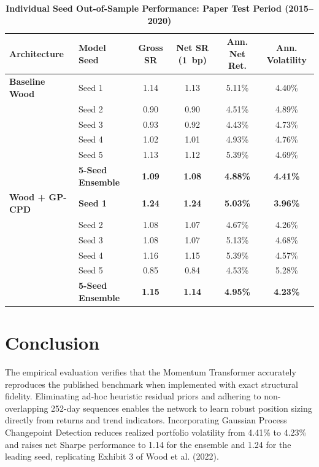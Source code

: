 \documentclass[11pt,a4paper]{article}
\begin{document}
\begin{table}[H]
\centering
\small
\caption{\textbf{Individual Seed Out-of-Sample Performance: Paper Test Period (2015--2020)}}
\label{tab:seed_perf}
\vspace{0.4em}
\begin{tabularx}{\textwidth}{l l c c c c}
\toprule
\textbf{Architecture} & \textbf{Model Seed} & \textbf{Gross SR} & \textbf{Net SR (1~bp)} & \textbf{Ann. Net Ret.} & \textbf{Ann. Volatility} \\
\midrule
\textbf{Baseline Wood} & Seed 1 & 1.14 & 1.13 & 5.11\% & 4.40\% \\
& Seed 2 & 0.90 & 0.90 & 4.51\% & 4.89\% \\
& Seed 3 & 0.93 & 0.92 & 4.43\% & 4.73\% \\
& Seed 4 & 1.02 & 1.01 & 4.93\% & 4.76\% \\
& Seed 5 & 1.13 & 1.12 & 5.39\% & 4.69\% \\
& \textbf{5-Seed Ensemble} & \textbf{1.09} & \textbf{1.08} & \textbf{4.88\%} & \textbf{4.41\%} \\
\midrule
\textbf{Wood + GP-CPD} & \textbf{Seed 1} & \textbf{1.24} & \textbf{1.24} & \textbf{5.03\%} & \textbf{3.96\%} \\
& Seed 2 & 1.08 & 1.07 & 4.67\% & 4.26\% \\
& Seed 3 & 1.08 & 1.07 & 5.13\% & 4.68\% \\
& Seed 4 & 1.16 & 1.15 & 5.39\% & 4.57\% \\
& Seed 5 & 0.85 & 0.84 & 4.53\% & 5.28\% \\
& \textbf{5-Seed Ensemble} & \textbf{1.15} & \textbf{1.14} & \textbf{4.95\%} & \textbf{4.23\%} \\
\bottomrule
\end{tabularx}
\end{table}

\section{Conclusion}

The empirical evaluation verifies that the Momentum Transformer accurately reproduces the published benchmark when implemented with exact structural fidelity. Eliminating ad-hoc heuristic residual priors and adhering to non-overlapping 252-day sequences enables the network to learn robust position sizing directly from returns and trend indicators. Incorporating Gaussian Process Changepoint Detection reduces realized portfolio volatility from 4.41\% to 4.23\% and raises net Sharpe performance to 1.14 for the ensemble and 1.24 for the leading seed, replicating Exhibit 3 of Wood et al. (2022).
\end{document}
